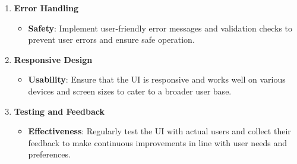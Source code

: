 \begin{enumerate}
\item \textbf{Error Handling}
    \begin{itemize}
        \tightlist
        \item \textbf{Safety}: Implement user-friendly error messages and validation checks to prevent user errors and ensure safe operation.
    \end{itemize}


\item \textbf{Responsive Design}
    \begin{itemize}
        \tightlist
        \item \textbf{Usability}: Ensure that the UI is responsive and works well on various devices and screen sizes to cater to a broader user base.
    \end{itemize}


\item \textbf{Testing and Feedback}
    \begin{itemize}
        \tightlist
        \item \textbf{Effectiveness}: Regularly test the UI with actual users and collect their feedback to make continuous improvements in line with user needs and preferences.
    \end{itemize}

\end{enumerate}